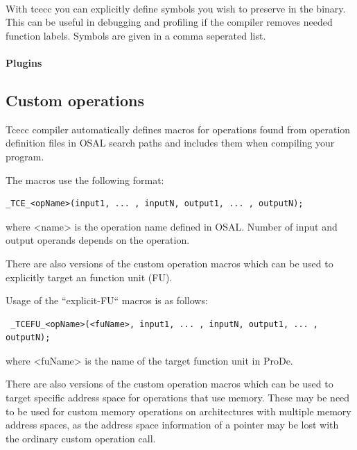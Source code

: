 \documentclass[twoside]{tceusermanual}
\begin{document}

 \\

With tcecc you can explicitly define symbols you wish to preserve in the
binary. This can be useful in debugging and profiling if the compiler removes
needed function labels.
Symbols are given in a comma seperated list.


\paragraph{Plugins}

\subsection{Custom operations}
\label{sec:tceccCustOp}

Tcecc compiler automatically defines macros for operations found from
operation definition files in OSAL search paths and includes them
when compiling your program.

The macros use the following format:

\begin{verbatim}
_TCE_<opName>(input1, ... , inputN, output1, ... , outputN);
\end{verbatim}
where <name> is the operation name defined in OSAL. Number of input and
output operands depends on the operation.

There are also versions of the custom operation macros which can be used
to explicitly target an function unit (FU). 

Usage of the ``explicit-FU`` macros is as follows:

\begin{verbatim}
 _TCEFU_<opName>(<fuName>, input1, ... , inputN, output1, ... , outputN);
\end{verbatim}

where <fuName> is the name of the target function unit in ProDe. 

There are also versions of the custom operation macros which can be
used to target specific address space for operations that use memory.
These may be need to be used for custom memory operations on architectures with
multiple memory address spaces, as the address space information of a pointer
may be lost with the ordinary custom operation call.
\end{document}
